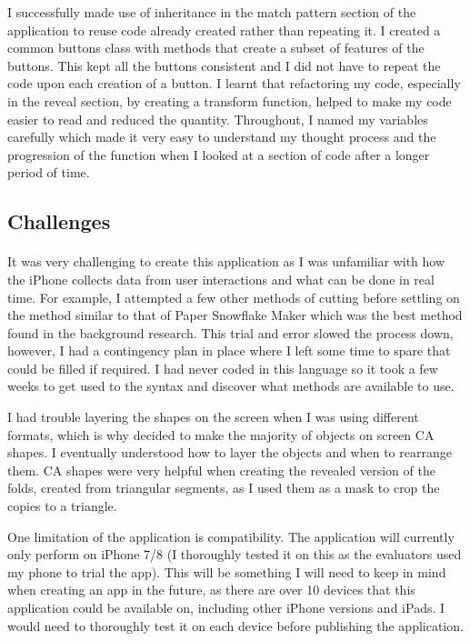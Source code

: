\documentclass[11pt]{article}
\begin{document}
        I successfully made use of inheritance in the match pattern section of the application to reuse code already created rather than repeating it. I created a common buttons class with methods that create a subset of features of the buttons. This kept all the buttons consistent and I did not have to repeat the code upon each creation of a button. I learnt that refactoring my code, especially in the reveal section, by creating a transform function, helped to make my code easier to read and reduced the quantity. Throughout, I named my variables carefully which made it very easy to understand my thought process and the progression of the function when I looked at a section of code after a longer period of time. 
        
    \subsection{Challenges}
    
        \paragraph{}
        It was very challenging to create this application as I was unfamiliar with how the iPhone collects data from user interactions and what can be done in real time. For example, I attempted a few other methods of cutting before settling on the method similar to that of Paper Snowflake Maker which was the best method found in the background research. This trial and error slowed the process down, however, I had a contingency plan in place where I left some time to spare that could be filled if required. I had never coded in this language so it took a few weeks to get used to the syntax and discover what methods are available to use.
        
        I had trouble layering the shapes on the screen when I was using different formats, which is why decided to make the majority of objects on screen CA shapes. I eventually understood how to layer the objects and when to rearrange them. CA shapes were very helpful when creating the revealed version of the folds, created from triangular segments, as I used them as a mask to crop the copies to a triangle.
        
        One limitation of the application is compatibility. The application will currently only perform on iPhone 7/8 (I thoroughly tested it on this as the evaluators used my phone to trial the app). This will be something I will need to keep in mind when creating an app in the future, as there are over 10 devices that this application could be available on, including other iPhone versions and iPads. I would need to thoroughly test it on each device before publishing the application. 
            
\end{document}
